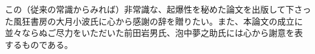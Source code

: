 この（従来の常識からみれば）非常識な、起爆性を秘めた論文を出版して下さっ
た風狂書房の大月小波氏に心から感謝の辞を贈りたい。また、本論文の成立に
並々ならぬご尽力をいただいた前田岩男氏、泡中夢之助氏には心から謝意を表
するものである。



